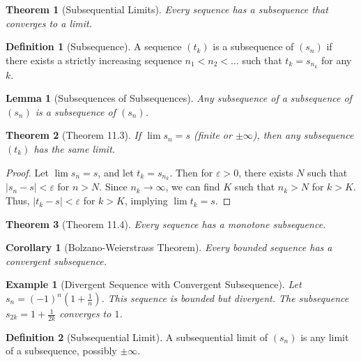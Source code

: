 \documentclass[7pt]{article}
\theoremstyle{definition}
\newtheorem{definition}{Definition}
\theoremstyle{plain}
\newtheorem{theorem}{Theorem}
\newtheorem{example}{Example}
\newtheorem{corollary}{Corollary}
\newtheorem{lemma}{Lemma}
\begin{document}
\begin{theorem}[Subsequential Limits]
Every sequence has a subsequence that converges to a limit.
\end{theorem}

\begin{definition}[Subsequence]
A sequence $ (t_k) $ is a subsequence of $ (s_n) $ if there exists a strictly increasing sequence $ n_1 < n_2 < \ldots $ such that $ t_k = s_{n_k} $ for any $ k $.
\end{definition}

\begin{lemma}[Subsequences of Subsequences]
Any subsequence of a subsequence of $ (s_n) $ is a subsequence of $ (s_n) $.
\end{lemma}

\begin{theorem}[Theorem 11.3]
If $ \lim s_n = s $ (finite or $ \pm\infty $), then any subsequence $ (t_k) $ has the same limit.
\end{theorem}

\begin{proof}
Let $ \lim s_n = s $, and let $ t_k = s_{n_k} $. Then for $ \varepsilon > 0 $, there exists $ N $ such that $ |s_n - s| < \varepsilon $ for $ n > N $. Since $ n_k \to \infty $, we can find $ K $ such that $ n_k > N $ for $ k > K $. Thus, $ |t_k - s| < \varepsilon $ for $ k > K $, implying $ \lim t_k = s $.
\end{proof}

\begin{theorem}[Theorem 11.4]
Every sequence has a monotone subsequence.
\end{theorem}

\begin{corollary}[Bolzano-Weierstrass Theorem]
Every bounded sequence has a convergent subsequence.
\end{corollary}

\begin{example}[Divergent Sequence with Convergent Subsequence]
Let $ s_n = (-1)^n \left(1 + \frac{1}{n}\right) $. This sequence is bounded but divergent. The subsequence $ s_{2k} = 1 + \frac{1}{2k} $ converges to $ 1 $.
\end{example}

\begin{definition}[Subsequential Limit]
A subsequential limit of $ (s_n) $ is any limit of a subsequence, possibly $ \pm\infty $.
\end{definition}
\end{document}

